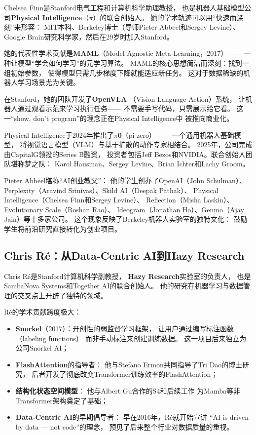Chelsea Finn是Stanford电气工程和计算机科学助理教授，
也是机器人基础模型公司\textbf{Physical Intelligence}（$\pi$）的联合创始人。
她的学术轨迹可以用``快速而深刻''来形容：
MIT本科、Berkeley博士（导师Pieter Abbeel和Sergey Levine）、
Google Brain研究科学家，然后在29岁时加入Stanford。

她的代表性学术贡献是\textbf{MAML}（Model-Agnostic Meta-Learning，2017）——
一种让模型``学会如何学习''的元学习算法。
MAML的核心思想简洁而深刻：找到一组初始参数，
使得模型只需几步梯度下降就能适应新任务。
这对于数据稀缺的机器人学习场景尤为关键。

在Stanford，她的团队开发了\textbf{OpenVLA}
（Vision-Language-Action）系统，
让机器人通过观看示范来学习执行任务——
不需要手写代码，只需展示给它看。
这一``show, don't program''的理念正在Physical Intelligence中
被推向商业化。

Physical Intelligence于2024年推出了\textbf{$\pi$0}（pi-zero）——
一个通用机器人基础模型，
将视觉语言模型（VLM）与基于扩散的动作专家相结合。
2025年，公司完成由CapitalG领投的Series B融资，
投资者包括Jeff Bezos和NVIDIA。联合创始人团队堪称梦之队：
Karol Hausman、Sergey Levine、Brian Ichter和Lachy Groom。

\begin{keybox}
Pieter Abbeel堪称``AI创业教父''：
他的学生创办了OpenAI（John Schulman）、
Perplexity（Aravind Srinivas）、Skild AI（Deepak Pathak）、
Physical Intelligence（Chelsea Finn和Sergey Levine）、
Reflection（Misha Laskin）、Evolutionary Scale（Roshan Rao）、
Ideogram（Jonathan Ho）、Genmo（Ajay Jain）等十多家公司。
这个现象反映了Berkeley机器人实验室的独特文化：
鼓励学生将前沿研究直接转化为创业项目。
\end{keybox}

\subsection{Chris R\'{e}：从Data-Centric AI到Hazy Research}

Chris R\'{e}是Stanford计算机科学副教授，
\textbf{Hazy Research}实验室的负责人，
也是SambaNova Systems和Together AI的联合创始人。
他的研究在机器学习与数据管理的交叉点上开辟了独特的领域。

R\'{e}的学术贡献跨度极大：

\begin{itemize}[noitemsep]
  \item \textbf{Snorkel}（2017）：开创性的弱监督学习框架，
        让用户通过编写标注函数（labeling functions）
        而非手动标注来创建训练数据。
        这一项目后来独立为公司Snorkel AI；
  \item \textbf{FlashAttention}的指导者：
        他与Stefano Ermon共同指导了Tri Dao的博士研究，
        后者开发了彻底改变Transformer训练效率的FlashAttention；
  \item \textbf{结构化状态空间模型}：
        他与Albert Gu合作的S4和后续工作
        为Mamba等非Transformer架构奠定了基础；
  \item \textbf{Data-Centric AI}的早期倡导者：
        早在2016年，R\'{e}就开始宣讲
        ``AI is driven by data — not code''的理念，
        预见了后来整个行业对数据质量的重视。
\end{itemize}

